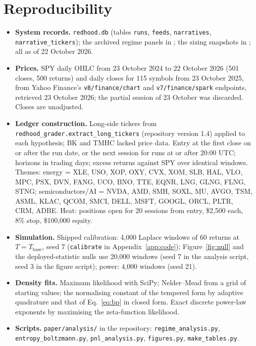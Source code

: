 \documentclass[11pt]{article}
\newcommand{\Tb}{T_{\mathrm{base}}}
\begin{document}
\section{Reproducibility}\label{app:repro}
\begin{itemize}
\item \textbf{System records.} \texttt{redhood.db} (tables \texttt{runs}, \texttt{feeds}, \texttt{narratives}, \texttt{narrative\_tickers}); the archived regime panels in ; the sizing snapshots in ; all as of 22 October 2026.
\item \textbf{Prices.} SPY daily OHLC from 23 October 2024 to 22 October 2026 (501 closes, 500 returns) and daily closes for 115 symbols from 23 October 2025, from Yahoo Finance's \texttt{v8/finance/chart} and \texttt{v7/finance/spark} endpoints, retrieved 23 October 2026; the partial session of 23 October was discarded. Closes are unadjusted.
\item \textbf{Ledger construction.} Long-side tickers from \texttt{redhood\_grader.extract\_long\_tickers} (repository version 1.4) applied to each hypothesis; BK and TMHC lacked price data. Entry at the first close on or after the run date, or the next session for runs at or after 20:00 UTC; horizons in trading days; excess returns against SPY over identical windows. Themes: energy = XLE, USO, XOP, OXY, CVX, XOM, SLB, HAL, VLO, MPC, PSX, DVN, FANG, UCO, BNO, TTE, EQNR, LNG, GLNG, FLNG, STNG; semiconductors/AI = NVDA, AMD, SMH, SOXL, MU, AVGO, TSM, ASML, KLAC, QCOM, SMCI, DELL, MSFT, GOOGL, ORCL, PLTR, CRM, ADBE. Heat: positions open for 20 sessions from entry, \$2,500 each, 8\% stop, \$100,000 equity.
\item \textbf{Simulation.} Shipped calibration: 4,000 Laplace windows of 60 returns at $T=\Tb$, seed 7 (\texttt{calibrate} in Appendix~\ref{app:code}); Figure~\ref{fig:null} and the deployed-statistic nulls use 20,000 windows (seed 7 in the analysis script, seed 3 in the figure script); power: 4,000 windows (seed 21).
\item \textbf{Density fits.} Maximum likelihood with SciPy; Nelder--Mead from a grid of starting values; the normalising constant of the tempered form by adaptive quadrature and that of Eq.~\eqref{eq:bp} in closed form. Exact discrete power-law exponents by maximising the zeta-function likelihood.
\item \textbf{Scripts.} \texttt{paper/analysis/} in the repository: \texttt{regime\_analysis.py}, \texttt{entropy\_boltzmann.py}, \texttt{pnl\_analysis.py}, \texttt{figures.py}, \texttt{make\_tables.py}.
\end{itemize}
\end{document}
